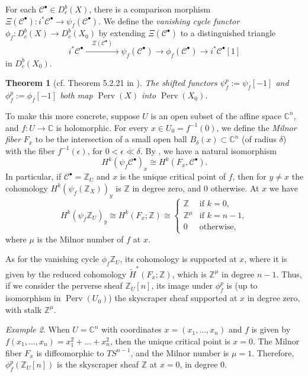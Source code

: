 \documentclass [11pt]{amsart}
\newtheorem {theorem}{Theorem}[section]
\theoremstyle{remark}
\newtheorem {example}[theorem]{Example}
\def\zz {{\mathbb{Z}}}
\def\cc {{\mathbb{C}}}
\def\C{\cc}
\def\Z {\zz}
\def\Perv {\operatorname{Perv}}
\def\Cb {\mathcal{C}^{\bullet}}
\begin{document}
For each $\Cb \in D^b_c(X)$, there is a comparison morphism $\Xi(\Cb): i^* \Cb \to \psi_f(\Cb)$. We define the {\em vanishing cycle functor} $ \phi_f: D^b_c(X) \to D^b_c(X_0)$ by extending $\Xi(\Cb)$ to a distinguished triangle
$$ i^* \Cb \xrightarrow{\phantom{aa}\Xi(\Cb)\phantom{aa}} \psi_f(\Cb) \longrightarrow \phi_f(\Cb)  \longrightarrow i^* \Cb[1]$$
in $D^b_c(X_0)$. 

\begin{theorem}[cf. Theorem 5.2.21 in \cite{Dimca}]
The shifted functors $\psi^p_f := \psi_f[-1]$ and $\phi_f^p := \phi_f[-1]$ both map $\Perv(X)$ into $\Perv(X_0)$.
\end{theorem}

To make this more concrete, suppose $U$ is an open subset of the affine space $\C^n$, and $f: U \to \C$ is holomorphic. For every $x \in U_0=f^{-1}(0)$, we define the {\em Milnor fiber} $F_x$ to be the intersection of a small open ball $B_\delta(x) \subset \C^n$ (of radius $\delta$) with the fiber $f^{-1}(\epsilon)$, for $0 < \epsilon \ll \delta$. By \cite[Proposition 4.2.2]{Dimca}, we have a natural isomorphism
$$ H^k(\psi_f \Cb)_x \cong H^k(F_x, \Cb).$$
In particular, if $\Cb = \Z_U$ and $x$ is the unique critical point of $f$, then for $y \neq x$ the cohomology $ H^k(\psi_f(\Z_X))_y$ is $\Z$ in degree zero, and $0$ otherwise. At $x$ we have 
$$H^k(\psi_f\Z_U)_y \cong H^k(F_x; \Z) \cong \begin{cases} \Z & \text{if }k=0,\\
\Z^{\mu}& \text{if }k=n-1,\\
0 & \text{otherwise},
\end{cases}
$$
where $\mu$ is the Milnor number of $f$ at $x$. 

As for the vanishing cycle $\phi_f\Z_U$, its cohomology is supported at $x$, where it is given by the reduced cohomology $\tilde{H}^*(F_x; \Z)$, which is $\Z^{\mu}$ in degree $n-1$. Thus, if we consider the perverse sheaf $\Z_U[n]$, its image under $\phi_f^p$ is (up to isomorphism in $\Perv(U_0)$) the skyscraper sheaf supported at $x$ in degree zero, with stalk $\Z^{\mu}$.

\begin{example}
\label{ex:U}
When $U=\C^n$ with coordinates $x=(x_1, \dots, x_n)$ and $f$ is given by $f(x_1, \dots, x_n)=x_1^2 + \dots + x_n^2$, then the unique critical point is $x=0$. The Milnor fiber $F_x$ is diffeomorphic to $TS^{n-1}$, and the Milnor number is $\mu=1$. Therefore, $\phi_f^p(\Z_U[n])$ is the skyscraper sheaf $\Z$ at $x=0$, in degree $0$.
\end{example}
\end{document}
